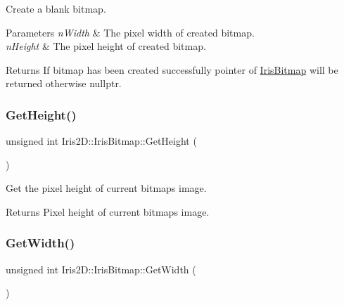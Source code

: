 Create a blank bitmap. 


\begin{DoxyParams}{Parameters}
{\em n\+Width} & The pixel width of created bitmap. \\
\hline
{\em n\+Height} & The pixel height of created bitmap. \\
\hline
\end{DoxyParams}
\begin{DoxyReturn}{Returns}
If bitmap has been created successfully pointer of \hyperlink{class_iris2_d_1_1_iris_bitmap}{Iris\+Bitmap} will be returned otherwise nullptr. 
\end{DoxyReturn}
\mbox{\label{class_iris2_d_1_1_iris_bitmap_ad97028fda44cce4622d8ab78d8ba16b9}} 
\subsubsection{\texorpdfstring{Get\+Height()}{GetHeight()}}
{\footnotesize\ttfamily unsigned int Iris2\+D\+::\+Iris\+Bitmap\+::\+Get\+Height (\begin{DoxyParamCaption}{ }\end{DoxyParamCaption})}



Get the pixel height of current bitmap\textquotesingle{}s image. 

\begin{DoxyReturn}{Returns}
Pixel height of current bitmap\textquotesingle{}s image. 
\end{DoxyReturn}
\mbox{\label{class_iris2_d_1_1_iris_bitmap_a5bf259139daf86b07d8f0ff8dad44302}} 
\subsubsection{\texorpdfstring{Get\+Width()}{GetWidth()}}
{\footnotesize\ttfamily unsigned int Iris2\+D\+::\+Iris\+Bitmap\+::\+Get\+Width (\begin{DoxyParamCaption}{ }\end{DoxyParamCaption})}



